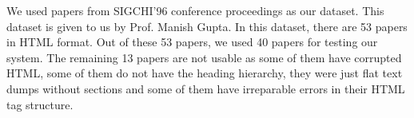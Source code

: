 We used papers from SIGCHI'96 conference proceedings as our dataset. This dataset is given to us by Prof. Manish Gupta. In this dataset, there are 53 papers in HTML format. Out of these 53 papers, we used 40 papers for testing our system. The remaining 13 papers are not usable as some of them have corrupted HTML, some of them do not have the heading hierarchy, they were just flat text dumps without sections and some of them have irreparable errors in their HTML tag structure.